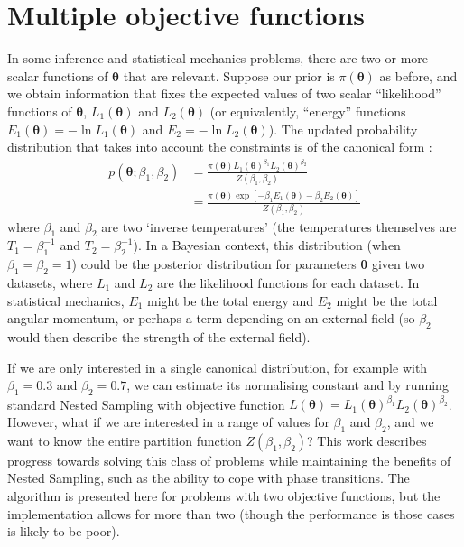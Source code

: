 \documentclass[entropy,article,submit,moreauthors,pdftex,10pt,a4paper]{Definitions/mdpi}
\newcommand{\xx}{\boldsymbol{\theta}}
\begin{document}
\section{Multiple objective functions}
In some inference and
statistical mechanics problems, there are two or more scalar functions of
$\xx$ that are relevant. Suppose our prior is $\pi(\xx)$ as before, and
we obtain information that fixes the expected values of two scalar
``likelihood'' functions of $\xx$, $L_1(\xx)$ and $L_2(\xx)$
(or equivalently, ``energy'' functions $E_1(\xx) = -\ln L_1(\xx)$ and
$E_2 = -\ln L_2(\xx)$). The
updated probability distribution that takes into account the constraints is
of the canonical form \citep{jaynes1957information}:
\begin{align}
p(\xx; \beta_1, \beta_2) &=
    \frac{\pi(\xx)L_1(\xx)^{\beta_1}L_2(\xx)^{\beta_2}}
         {Z(\beta_1, \beta_2)} \\
    &=
    \frac{\pi(\xx)\exp\left[-\beta_1E_1(\xx) - \beta_2E_2(\xx)\right]}
         {Z(\beta_1, \beta_2)}
\end{align}
where $\beta_1$ and $\beta_2$ are two `inverse temperatures' (the temperatures
themselves are $T_1 = \beta_1^{-1}$ and $T_2 = \beta_2^{-1}$).
In a Bayesian
context, this distribution (when $\beta_1 = \beta_2 = 1$) could be the
posterior distribution for parameters $\xx$
given two datasets, where $L_1$ and $L_2$ are the
likelihood functions for each dataset. In statistical mechanics, $E_1$ might
be the total energy and $E_2$ might be the total
angular momentum, or perhaps a term depending on an external field (so $\beta_2$
would then describe the strength of the external field).

If we are only interested in a single canonical distribution, for example
with $\beta_1 = 0.3$ and $\beta_2 = 0.7$, we can estimate its normalising
constant and by running standard Nested Sampling with objective function
$L(\xx) = L_1(\xx)^{\beta_1}L_2(\xx)^{\beta_2}$. However, what if we
are interested in a range of values for $\beta_1$ and $\beta_2$, and we
want to know the entire partition function $Z(\beta_1, \beta_2)$?
This work describes
progress towards solving this class of problems while maintaining the benefits
of Nested Sampling, such as the ability to cope with phase
transitions. The algorithm is presented here for problems with two objective
functions, but the implementation allows for more than two (though the
performance is those cases is likely to be poor).
\end{document}
